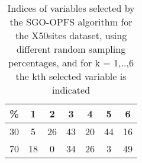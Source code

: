 \begin{table}
	\begin{center}
		\begin{tabular}{c c c c c c c}
			\% & 1 & 2 & 3 & 4 & 5 & 6 \\
			\hline
			30 & 5 & 26 & 43 & 20 & 44 & 16 \\
			70 & 18 & 0 & 34 & 26 & 3 & 49 \\
		\end{tabular}
	\end{center}
	\caption{Indices of variables selected by the SGO-OPFS algorithm for the X50sites dataset, using different random sampling percentages, and for k = 1,..,6 the kth selected variable is indicated}
\end{table}
